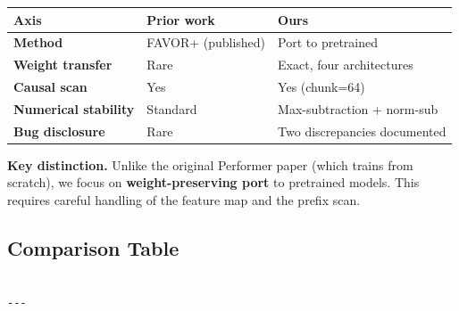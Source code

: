 \begin{table}[H]
\centering
\small
\begin{tabular}{lll}
\toprule
\textbf{Axis} & \textbf{Prior work} & \textbf{Ours} \\
\midrule
\textbf{Method} & FAVOR+ (published) & Port to pretrained \\
\textbf{Weight transfer} & Rare & Exact, four architectures \\
\textbf{Causal scan} & Yes & Yes (chunk=64) \\
\textbf{Numerical stability} & Standard & Max-subtraction + norm-sub \\
\textbf{Bug disclosure} & Rare & Two discrepancies documented \\
\bottomrule
\end{tabular}
\end{table}

\textbf{Key distinction.} Unlike the original Performer paper (which trains from 
scratch), we focus on \textbf{weight-preserving port} to pretrained models. This 
requires careful handling of the feature map and the prefix scan.



\subsection{Comparison Table}

\begin{lstlisting}

---
\end{lstlisting}